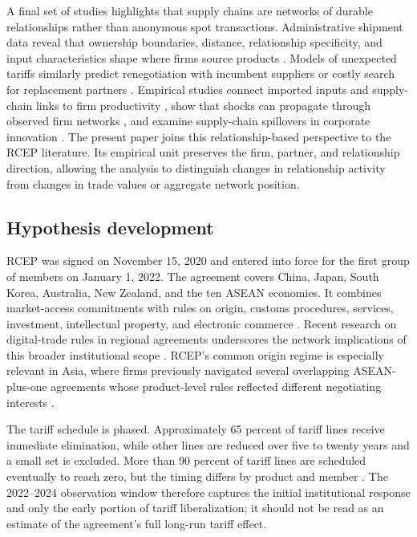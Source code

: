 \documentclass[preprint,12pt,authoryear]{elsarticle}
\begin{document}
A final set of studies highlights that supply chains are networks of durable relationships rather than anonymous spot transactions. Administrative shipment data reveal that ownership boundaries, distance, relationship specificity, and input characteristics shape where firms source products \citep{garg2023within}. Models of unexpected tariffs similarly predict renegotiation with incumbent suppliers or costly search for replacement partners \citep{grossman2024tariffs}. Empirical studies connect imported inputs and supply-chain links to firm productivity \citep{newman2023imports}, show that shocks can propagate through observed firm networks \citep{crosignani2022pirates}, and examine supply-chain spillovers in corporate innovation \citep{ou2026spillovers}. The present paper joins this relationship-based perspective to the RCEP literature. Its empirical unit preserves the firm, partner, and relationship direction, allowing the analysis to distinguish changes in relationship activity from changes in trade values or aggregate network position.

\subsection{Hypothesis development}

RCEP was signed on November 15, 2020 and entered into force for the first group of members on January 1, 2022. The agreement covers China, Japan, South Korea, Australia, New Zealand, and the ten ASEAN economies. It combines market-access commitments with rules on origin, customs procedures, services, investment, intellectual property, and electronic commerce \citep{shen2020rcep,ping2021rcep}. Recent research on digital-trade rules in regional agreements underscores the network implications of this broader institutional scope \citep{li2026digitalrules}. RCEP's common origin regime is especially relevant in Asia, where firms previously navigated several overlapping ASEAN-plus-one agreements whose product-level rules reflected different negotiating interests \citep{hayakawa2022multiple,hayakawa2024negotiating}.

The tariff schedule is phased. Approximately 65 percent of tariff lines receive immediate elimination, while other lines are reduced over five to twenty years and a small set is excluded. More than 90 percent of tariff lines are scheduled eventually to reach zero, but the timing differs by product and member \citep{liu2022rcep}. The 2022--2024 observation window therefore captures the initial institutional response and only the early portion of tariff liberalization; it should not be read as an estimate of the agreement's full long-run tariff effect.
\end{document}
